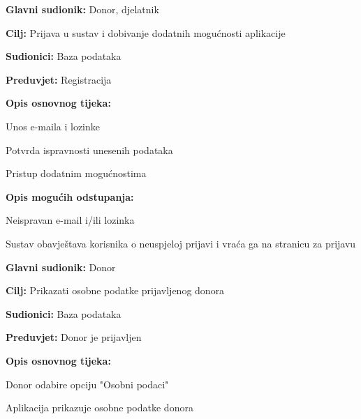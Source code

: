 					\begin{packed_item}
	
						\item \textbf{Glavni sudionik: }Donor, djelatnik
						\item \textbf{Cilj:} Prijava u sustav i dobivanje dodatnih mogućnosti aplikacije
						\item \textbf{Sudionici:} Baza podataka
						\item \textbf{Preduvjet:} Registracija
						\item \textbf{Opis osnovnog tijeka:}
						
						\item[] \begin{packed_enum}
	
							\item Unos e-maila i lozinke
							\item Potvrda ispravnosti unesenih podataka
							\item Pristup dodatnim mogućnostima
							
						\end{packed_enum}
						\item  \textbf{Opis mogućih odstupanja:}
						
						\item[] \begin{packed_item}
	
							\item[2.a] Neispravan e-mail i/ili lozinka
							\item[] \begin{packed_enum}
								
								\item  Sustav obavještava korisnika o neuspjeloj prijavi i vraća ga na stranicu za prijavu

								
							\end{packed_enum}
					\end{packed_item}
					\end{packed_item}
\noindent {}
					\begin{packed_item}
	
						\item \textbf{Glavni sudionik: }Donor
						\item \textbf{Cilj:} Prikazati osobne podatke prijavljenog donora
						\item \textbf{Sudionici:} Baza podataka
						\item \textbf{Preduvjet:} Donor je prijavljen
						\item \textbf{Opis osnovnog tijeka:}
						
						\item[] \begin{packed_enum}
	
							\item Donor odabire opciju "Osobni podaci"
							\item Aplikacija prikazuje osobne podatke donora
							
						\end{packed_enum}

					\end{packed_item}
